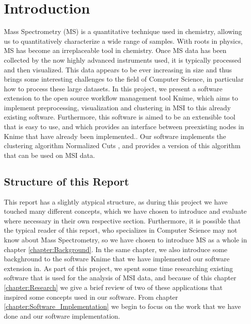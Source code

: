 \documentclass[11pt,openany]{book}
\begin{document}
\chapter{Introduction}
Mass Spectrometry (MS) is a quantitative technique used in chemistry, allowing us to quantitatively characterize a wide range of samples. With roots in physics, MS has become an irreplaceable tool in chemistry. Once MS data has been collected by the now highly advanced instruments used, it is typically processed and then visualized. This data appears to be ever increasing in size and thus brings some interesting challenges to the field of Computer Science, in particular how to process these large datasets. In this project, we present a software extension to the open source workflow management tool Knime, which aims to implement preprocessing, visualization and clustering in MSI to this already existing software. Furthermore, this software is aimed to be an extensible tool that is easy to use, and which provides an interface between preexisting nodes in Knime that have already been implemented.. Our software implements the clustering algorithm Normalized Cuts \cite{normalized_cuts_algorithm}, and provides a version of this algorithm that can be used on MSI data. 

\section{Structure of this Report}
This report has a slightly atypical structure, as during this project we have touched many different concepts, which we have chosen to introduce and evaluate where necessary in their own respective section. Furthermore, it is possible that the typical reader of this report, who specializes in Computer Science may not know about Mass Spectrometry, so we have chosen to introduce MS as a whole in chapter \ref{chapter:Background}. In the same chapter, we also introduce some backghround to the software Knime that we have implemented our software extension in.  As part of this project, we spent some time researching existing software that is used for the analysis of MSI data, and because of this chapter \ref{chapter:Research} we give a brief review of two of these applications that inspired some concepts used in our software. From chapter \ref{chapter:Software_Implementation} we begin to focus on the work that we have done and our software implementation. 

\newpage
\end{document}
